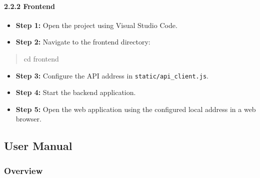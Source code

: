 \paragraph*{2.2.2 Frontend}

\begin{itemize}[leftmargin=1.5em, nosep]
    \item \textbf{Step 1:} Open the project using Visual Studio Code.
    \item \textbf{Step 2:} Navigate to the frontend directory:
\end{itemize}
\begin{quote}\ttfamily
 cd frontend
\end{quote}
\begin{itemize}[leftmargin=1.5em, nosep]
    \item \textbf{Step 3:} Configure the API address in \texttt{static/api\_client.js}.
    \item \textbf{Step 4:} Start the backend application.
    \item \textbf{Step 5:} Open the web application using the configured local address in a web browser.
\end{itemize}

\subsection{User Manual}
\label{subsec:user-manual}

\subsubsection{Overview}
\label{subsubsec:user-manual-overview}

